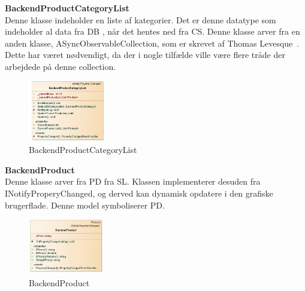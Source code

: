 \textbf{BackendProductCategoryList}\\
Denne klasse indeholder en liste af kategorier. Det er denne datatype som indeholder al data fra \gls{DB} , når det hentes ned fra \gls{CS}. Denne klasse arver fra en anden klasse, ASyncObservableCollection, som er skrevet af Thomas Levesque~\cite{ASYNC}. Dette har været nødvendigt, da der i nogle tilfælde ville være flere tråde der arbejdede på denne collection.
\begin{center}
\begin{figure}[!h]
    \centering
    \includegraphics[width=0.30\textwidth]{Systemdesign/backend/klassebeskrivelser/Images/BPCList.png}
    \caption{BackendProductCategoryList}
    \label{fig:BackendProductCategoryList}
\end{figure}
\end{center}
\label{BackendProductCategoryList_Beskrivelse}
 \bigskip 
 
 \textbf{BackendProduct}\\
Denne klasse arver fra \gls{PD} fra \gls{SL}. Klassen implementerer desuden fra INotifyProperyChanged, og derved kan dynamisk opdatere i den grafiske brugerflade. Denne model symboliserer \gls{PD}.
\begin{center}
\begin{figure}[!h]
    \centering
    \includegraphics[width=0.30\textwidth]{Systemdesign/backend/klassebeskrivelser/Images/Backendproduct.png}
    \caption{BackendProduct}
    \label{fig:BackendProduct}
\end{figure}
\end{center}
\label{BackendProduct_Beskrivelse}
 \bigskip 
 
